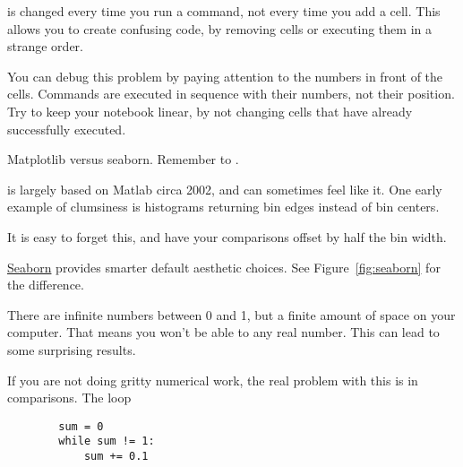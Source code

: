 \documentclass[justified, nobib]{tufte-handout}
\begin{document}
 is changed every time you run a command, not
every time you add a cell.
This allows you to create confusing code, by removing cells or executing them in a strange order.



\noindent
You can debug this problem by paying attention to the numbers in front of the cells.
Commands are executed in sequence with their numbers, not their position.
Try to keep your notebook linear, by not changing cells that have already successfully executed.

\pagebreak
\begin{marginfigure}[30pt]
    \vspace*{\fill}
    \centering

    \def\svgwidth{140pt}

    \vspace*{\fill}
    \bigskip
    \def\svgwidth{140pt}
  \caption{Matplotlib versus seaborn.
  \hspace{\textwidth}Remember to .}
\label{fig:seaborn}
\end{marginfigure}

 is largely based on Matlab circa 2002, and can sometimes feel like it. One early example of clumsiness is histograms returning bin edges instead of bin centers.



\noindent
It is easy to forget this, and have your comparisons  offset by half the bin width.

\noindent
\href{https://stanford.edu/~mwaskom/software/seaborn/index.html}{Seaborn} provides smarter default aesthetic choices.
See Figure~\ref{fig:seaborn} for the difference.

There are infinite numbers between 0 and 1, but a finite amount of space on your computer.
That means you won't be able to any real number.
This can lead to some surprising results.



\noindent
If you are not doing gritty numerical work, the real problem with this is in comparisons.
The loop
\begin{verbatim}
        sum = 0
        while sum != 1:
            sum += 0.1
\end{verbatim}
\end{document}
